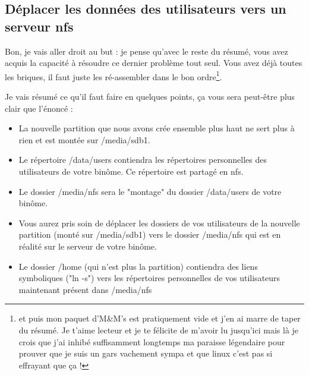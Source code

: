 \documentclass[a4paper]{article}
\begin{document}
\subsection{Déplacer les données des utilisateurs vers un serveur nfs}
\par Bon, je vais aller droit au but : je pense qu'avec le reste du résumé, vous avez acquis la capacité à résoudre ce dernier problème tout seul. Vous avez déjà toutes les briques, il faut juste les ré-assembler dans le bon ordre\footnote{et puis mon paquet d'M\&M's est pratiquement vide et j'en ai marre de taper du résumé. Je t'aime lecteur et je te félicite de m'avoir lu jusqu'ici mais là je crois que j'ai inhibé suffisamment longtemps ma paraisse légendaire pour prouver que je suis un gars vachement sympa et que linux c'est pas si effrayant que ça !}.
\par Je vais résumé ce qu'il faut faire en quelques points, ça vous sera peut-être plus clair que l'énoncé :
\begin{itemize}
\item La nouvelle partition que nous avons crée ensemble plus haut ne sert plus à rien et est montée sur /media/sdb1. 
\item Le répertoire /data/users contiendra les répertoires personnelles des utilisateurs de votre binôme. Ce répertoire est partagé en nfs.
\item Le dossier /media/nfs sera le "montage" du dossier /data/users de votre binôme.
\item Vous aurez pris soin de déplacer les dossiers de vos utilisateurs de la nouvelle partition (monté sur /media/sdb1) vers le dossier /media/nfs qui est en réalité sur le serveur de votre binôme.
\item Le dossier /home (qui n'est plus la partition) contiendra des liens symboliques ("ln -s") vers les répertoires personnelles de vos utilisateurs maintenant présent dans /media/nfs
\end{itemize}
\end{document}
